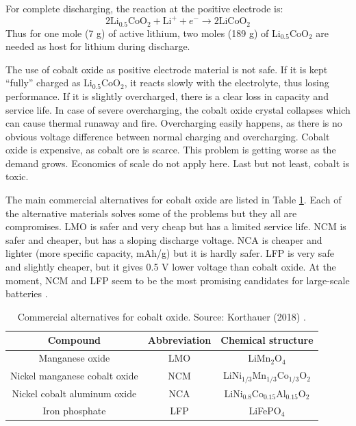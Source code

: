 For complete discharging, the reaction at the positive electrode is:
\begin{equation}
    \label{eq:positive-electrode}
    2\text{Li}_{0.5}\text{CoO}_2 + \text{Li}^+ + e^- \rightarrow 2\text{LiCoO}_2
\end{equation}
Thus for one mole (7 g) of active lithium, two moles (189 g) of Li$_{0.5}$CoO$_2$ are needed as host for lithium during discharge.

The use of cobalt oxide as positive electrode material is not safe. If it is kept “fully” charged as Li$_{0.5}$CoO$_2$, it reacts slowly with the electrolyte, thus losing performance. If it is slightly overcharged, there is a clear loss in capacity and service life. In case of severe overcharging, the cobalt oxide crystal collapses which can cause thermal runaway and fire. Overcharging easily happens, as there is no obvious voltage difference between normal charging and overcharging. Cobalt oxide is expensive, as cobalt ore is scarce. This problem is getting worse as the demand grows. Economics of scale do not apply here. Last but not least, cobalt is toxic.

The main commercial alternatives for cobalt oxide are listed in Table \ref{table:cathode-alternatives}. Each of the alternative materials solves some of the problems but they all are compromises. LMO is safer and very cheap but has a limited service life. NCM is safer and cheaper, but has a sloping discharge voltage. NCA is cheaper and lighter (more specific capacity, mAh/g) but it is hardly safer. LFP is very safe and slightly cheaper, but it gives 0.5 V lower voltage than cobalt oxide. At the moment, NCM and LFP seem to be the most promising candidates for large-scale batteries \cite{manthiram2020reflection,mekonnen2016review}.

\begin{table}[H]
    \centering 
    \begin{tabular}{|c c c|}
        \hline
        \rowcolor{bluepoli!40}
        \textbf{Compound} & \textbf{Abbreviation} & \textbf{Chemical structure} \T\B \\
        \hline \hline

        Manganese oxide & LMO & LiMn$_2$O$_4$\T\B\\
        \hline

        Nickel manganese cobalt oxide & NCM & LiNi$_{1/3}$Mn$_{1/3}$Co$_{1/3}$O$_2$\T\B\\
        \hline

        Nickel cobalt aluminum oxide & NCA & LiNi$_{0.8}$Co$_{0.15}$Al$_{0.15}$O$_2$\T\B\\
        \hline

        Iron phosphate & LFP & LiFePO$_4$\T\B\\
        \hline
    \end{tabular}
    \\[10pt]
    \caption[Commercial alternatives for cobalt oxide]{Commercial alternatives for cobalt oxide. Source: Korthauer (2018) \cite{korthauer2018lithium}.}
    \label{table:cathode-alternatives}
\end{table}

